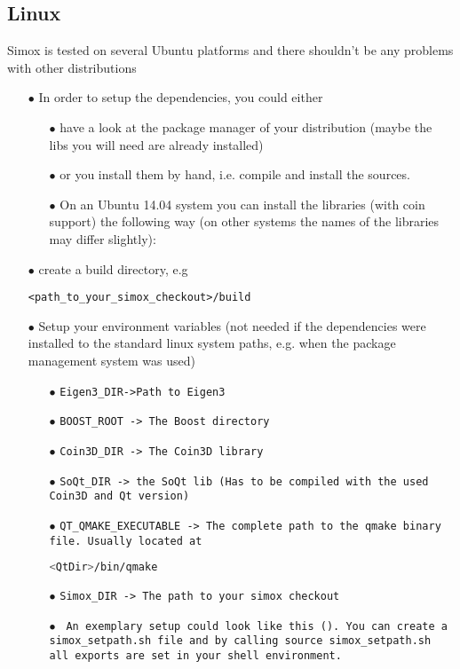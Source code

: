 \subsection{Linux}
Simox is tested on several Ubuntu platforms and there shouldn't be any problems with other distributions 
\begin{itemize}

\item[$\bullet$] In order to setup the dependencies, you could either 
\begin{itemize}
\item[$\bullet$] have a look at the package manager of your distribution (maybe the libs you will need are already installed) 
\item[$\bullet$] or you install them by hand, i.e. compile and install the sources.  
\item[$\bullet$] On an Ubuntu 14.04 system you can install the libraries (with coin support) the following way (on other systems the names of the libraries may differ slightly):
\end{itemize}
\item[$\bullet$] create a build directory, e.g \begin{lstlisting}
<path_to_your_simox_checkout>/build
\end{lstlisting}
\item[$\bullet$] Setup your environment variables (not needed if the dependencies were installed to the standard linux system paths, e.g. when the package management system was used) 
\begin{itemize}
\item[$\bullet$] \texttt{Eigen3\_DIR->Path to Eigen3}
\item[$\bullet$] \texttt{BOOST\_ROOT -> The Boost directory }
\item[$\bullet$] \texttt{Coin3D\_DIR -> The Coin3D library  }
\item[$\bullet$] \texttt{SoQt\_DIR -> the SoQt lib (Has to be compiled with the used Coin3D and Qt version)  }
\item[$\bullet$] \texttt{QT\_QMAKE\_EXECUTABLE -> The complete path to the qmake binary file. Usually located at } \begin{lstlisting}[language=bash]
<QtDir>/bin/qmake
\end{lstlisting}
\item[$\bullet$] \texttt{Simox\_DIR -> The path to your simox checkout }
\item[$\bullet$] \texttt{ An exemplary setup could look like this (\textbf{}). You can create a simox\_setpath.sh file and by calling source simox\_setpath.sh all exports are set in your shell environment. }


\end{itemize}
\end{itemize}
